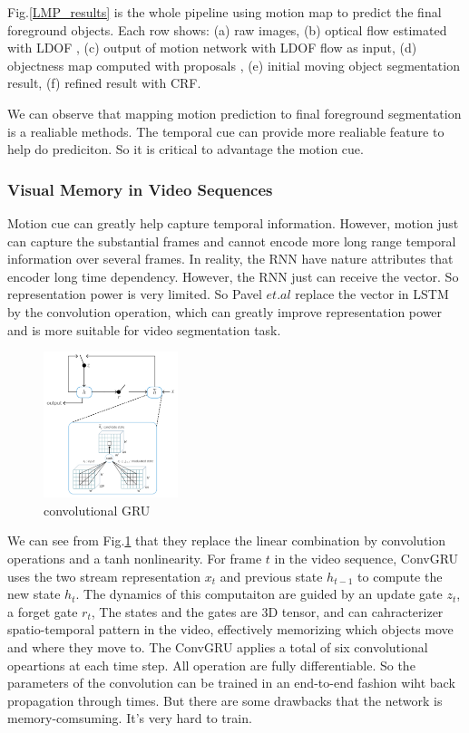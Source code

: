 Fig.\ref{LMP_results} is the whole pipeline using motion map to predict the final foreground objects. Each row shows: (a) raw images,
(b) optical flow estimated with LDOF \cite{brox2009large}, (c) output of motion network with LDOF flow as input, (d) objectness map computed with
proposals \cite{pinheiro2016learning}, (e) initial moving object segmentation result, (f) refined result with CRF.

We can observe that mapping motion prediction to final foreground segmentation is a realiable methods. The temporal cue can provide more realiable
feature to help do prediciton. So it is critical to advantage the motion cue.


\subsubsection{Visual Memory in Video Sequences}
Motion cue can greatly help capture temporal information. However, motion just can capture the substantial frames and cannot encode more long range
temporal information over several frames. In reality, the RNN have nature attributes that encoder long time dependency. However, the RNN just can 
receive the vector. So representation power is very limited. So Pavel $et.al$\cite{Tokmakov2017Learning} replace the vector in LSTM by the convolution 
operation, which can greatly improve representation power and is more suitable for video segmentation task.
\begin{figure}[ht]
    \centering
    \includegraphics[width=0.35\textwidth]{figure/LVO_CONVRRU.png}
    \caption{convolutional GRU}
    \label{CONVGRU}
\end{figure}

We can see from Fig.\ref{CONVGRU} that they replace the linear combination by convolution operations and a tanh nonlinearity. For frame $t$ in the video
sequence, ConvGRU uses the two stream representation $x_t$ and previous state $h_{t-1}$ to compute the new state $h_t$. The dynamics of this computaiton 
are guided by an update gate $z_t$, a forget gate $r_t$, The states  and the gates are $3$D tensor, and can cahracterizer spatio-temporal pattern in
the video, effectively memorizing which objects move and where they move to. The ConvGRU applies a total of six convolutional opeartions at each time step.
All operation are fully differentiable. So the parameters of the convolution can be trained in an end-to-end fashion wiht back propagation through times.
But there are some drawbacks that the network is memory-comsuming. It's very hard to train. 

